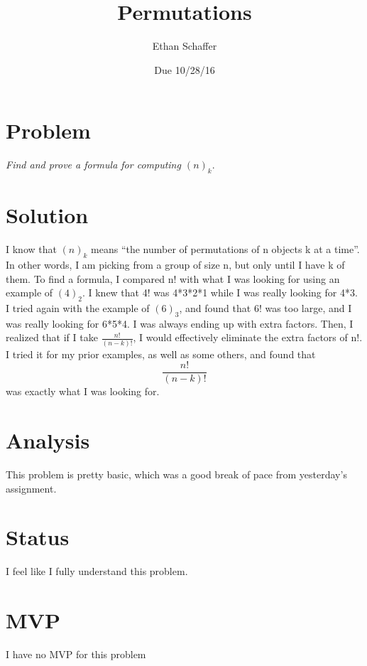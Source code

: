 \documentclass[11pt]{article} %
\title{Permutations}
\author{Ethan Schaffer}
\date{Due 10/28/16}
\newcommand\tab[1][1cm]{\hspace*{#1}}
\begin{document}
\maketitle
\section* {Problem}
\textit{Find and prove a formula for computing $(n)_k.$}

\section*{Solution}
I know that  $(n)_k$ means ``the number of permutations of n objects k at a time''. In other words, I am picking from a group of size n, but only until I have k of them. To find a formula, I compared n! with what I was looking for using an example of $(4)_2$. I knew that 4! was 4*3*2*1 while I was really looking for 4*3. I tried again with the example of $(6)_3$, and found that 6! was too large, and I was really looking for 6*5*4. I was always ending up with extra factors. Then, I realized that if I take $\frac{n!}{(n-k)!}$, I would effectively eliminate the extra factors of n!. I tried it for my prior examples, as well as some others, and found that \begin{equation}\frac{n!}{(n-k)!}\end{equation} was exactly what I was looking for.
 
\section* {Analysis}
This problem is pretty basic, which was a good break of pace from yesterday's assignment.

\section* {Status}
\tab I feel like I fully understand this problem.

\section* {MVP}
\tab I have no MVP for this problem
\end{document}
